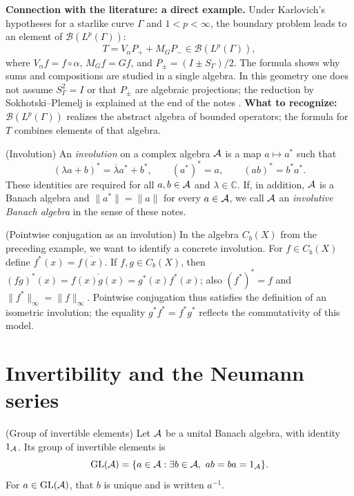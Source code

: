 \begin{investigacion}
\textbf{Connection with the literature: a direct example.}
Under Karlovich's hypotheses for a starlike curve $\Gamma$ and $1<p<\infty$, the boundary
problem leads to an element of $\mathcal B(L^p(\Gamma))$:
\[
 T=V_\alpha P_+ + M_G P_-\in \mathcal B(L^p(\Gamma)),
\]
where $V_\alpha f=f\circ\alpha$, $M_Gf=Gf$, and $P_\pm=(I\pm S_\Gamma)/2$.
The formula shows why sums and compositions are studied in a single algebra. In this
geometry one does not assume $S_\Gamma^2=I$ or that $P_\pm$ are algebraic projections;
the reduction by Sokhotski--Plemelj is explained at the end of the notes
\cite[pp.~463--464, eqs.~(1.1)--(1.2)]{Karlovich2017}.
\textbf{What to recognize:} $\mathcal B(L^p(\Gamma))$ realizes the abstract algebra of
bounded operators; the formula for $T$ combines elements of that algebra.
\end{investigacion}

\begin{cthdefinicion}{(Involution)}
An \emph{involution} on a complex algebra $\mathcal A$ is a map $a\mapsto a^*$ such that
\[
(\lambda a+b)^*=\overline\lambda a^*+b^*,\qquad
(a^*)^*=a,\qquad
(ab)^*=b^*a^*.
\]
These identities are required for all $a,b\in\mathcal A$ and $\lambda\in\mathbb C$.
If, in addition, $\mathcal A$ is a Banach algebra and $\|a^*\|=\|a\|$ for
every $a\in\mathcal A$, we call $\mathcal A$ an \emph{involutive Banach algebra}
in the sense of these notes.
\end{cthdefinicion}

\begin{cthejemplo}{(Pointwise conjugation as an involution)}
In the algebra $C_b(X)$ from the preceding example, we want to identify a
concrete involution. For $f\in C_b(X)$ define
$f^*(x)=\overline{f(x)}$. If $f,g\in C_b(X)$, then
$(fg)^*(x)=\overline{f(x)g(x)}=g^*(x)f^*(x)$;
also $(f^*)^*=f$ and $\|f^*\|_\infty=\|f\|_\infty$.
Pointwise conjugation thus satisfies the definition of an isometric
involution; the equality $g^*f^*=f^*g^*$ reflects the commutativity of this model.
\end{cthejemplo}

\section{Invertibility and the Neumann series}

\begin{cthdefinicion}{(Group of invertible elements)}
Let $\mathcal A$ be a unital Banach algebra, with identity $1_\mathcal A$. Its group of invertible elements is
\[
 \operatorname{GL}(\mathcal A)=\{a\in\mathcal A: \exists b\in\mathcal A,\ ab=ba=1_\mathcal A\}.
\]
For $a\in\operatorname{GL}(\mathcal A)$, that $b$ is unique and is written $a^{-1}$.
\end{cthdefinicion}

